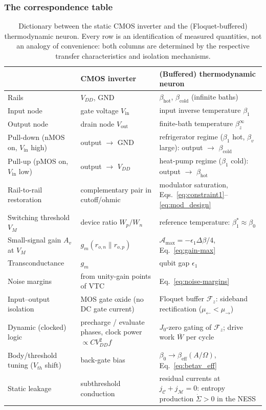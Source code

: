 \documentclass[11pt,a4paper]{article}
\theoremstyle{definition}
\theoremstyle{remark}
\begin{document}
\subsubsection{The correspondence table}
\begin{table}[h]
\centering
\begin{tabularx}{\textwidth}{@{}lXX@{}}
\toprule
& \textbf{CMOS inverter} & \textbf{(Buffered) thermodynamic neuron} \\
\midrule
Rails & $V_{DD}$, GND & $\beta_{\mathrm{hot}}$, $\beta_{\mathrm{cold}}$
(infinite baths) \\
Input node & gate voltage $V_{\mathrm{in}}$ & input inverse temperature
$\beta_1$ \\
Output node & drain node $V_{\mathrm{out}}$ & finite-bath temperature
$\beta_z^\infty$ \\
Pull-down (nMOS on, $V_{\mathrm{in}}$ high) & output $\to$ GND &
refrigerator regime ($\beta_1$ hot, $\beta_v$ large): output $\to$
$\beta_{\mathrm{cold}}$ \\
Pull-up (pMOS on, $V_{\mathrm{in}}$ low) & output $\to$ $V_{DD}$ &
heat-pump regime ($\beta_1$ cold): output $\to$ $\beta_{\mathrm{hot}}$ \\
Rail-to-rail restoration & complementary pair in cutoff/ohmic &
modulator saturation, Eqs.~\eqref{eq:constraint1}--\eqref{eq:mod_design} \\
Switching threshold $V_M$ & device ratio $W_p/W_n$ & reference
temperature: $\beta_1^\ast \approx \beta_0$ \\
Small-signal gain $A_v$ at $V_M$ & $g_m(r_{o,n}\|r_{o,p})$ &
$\mathcal{A}_{\max} = -\epsilon_1\Delta\beta/4$, Eq.~\eqref{eq:gain-max} \\
Transconductance & $g_m$ & qubit gap $\epsilon_1$ \\
Noise margins & from unity-gain points of VTC &
Eq.~\eqref{eq:noise-margins} \\
Input--output isolation & MOS gate oxide (no DC gate current) &
Floquet buffer $\mathcal{F}_z$: sideband rectification
($\mu_\leftarrow < \mu_\rightarrow$) \\
Dynamic (clocked) logic & precharge / evaluate phases, clock power
$\propto C V_{DD}^2 f$ & $J_0$-zero gating of $\mathcal{F}_z$;
drive work $\overline W$ per cycle \\
Body/threshold tuning ($V_{th}$ shift) & back-gate bias &
$\beta_0 \to \beta_{\mathrm{eff}}(A/\Omega)$,
Eq.~\eqref{eq:betav_eff} \\
Static leakage & subthreshold conduction & residual currents at
$j_\mathcal{C}+j_\mathcal{M}=0$: entropy production
$\dot\Sigma > 0$ in the NESS \\
\bottomrule
\end{tabularx}
\caption{Dictionary between the static CMOS inverter and the
(Floquet-buffered) thermodynamic neuron. Every row is an identification
of measured quantities, not an analogy of convenience: both columns are
determined by the respective transfer characteristics and isolation
mechanisms.}
\label{tab:cmos-dictionary}
\end{table}
 
\end{document}
